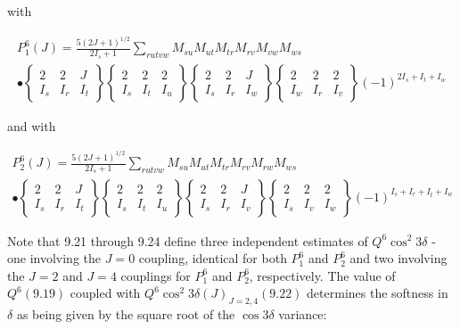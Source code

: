 \documentclass[10pt]{article}
\begin{document}
with


\begin{gather*}
P_{1}^{6}(J)=\frac{5(2 J+1)^{1 / 2}}{2 I_{s}+1} \sum_{r u t v w} M_{s u} M_{u t} M_{t r} M_{r v} M_{v w} M_{w s} \\
\bullet\left\{\begin{array}{ccc}
2 & 2 & J \\
I_{s} & I_{r} & I_{t}
\end{array}\right\}\left\{\begin{array}{ccc}
2 & 2 & 2 \\
I_{s} & I_{t} & I_{u}
\end{array}\right\}\left\{\begin{array}{ccc}
2 & 2 & J \\
I_{s} & I_{r} & I_{w}
\end{array}\right\}\left\{\begin{array}{ccc}
2 & 2 & 2 \\
I_{w} & I_{r} & I_{v}
\end{array}\right\}(-1)^{2 I_{s}+I_{t}+I_{w}} \tag{9.23}
\end{gather*}


and with


\begin{gather*}
P_{2}^{6}(J)=\frac{5(2 J+1)^{1 / 2}}{2 I_{s}+1} \sum_{r u t v w} M_{s u} M_{u t} M_{t r} M_{r v} M_{r w} M_{w s} \\
\bullet\left\{\begin{array}{ccc}
2 & 2 & J \\
I_{s} & I_{r} & I_{t}
\end{array}\right\}\left\{\begin{array}{ccc}
2 & 2 & 2 \\
I_{s} & I_{t} & I_{u}
\end{array}\right\}\left\{\begin{array}{ccc}
2 & 2 & J \\
I_{s} & I_{r} & I_{v}
\end{array}\right\}\left\{\begin{array}{ccc}
2 & 2 & 2 \\
I_{s} & I_{v} & I_{w}
\end{array}\right\}(-1)^{I_{s}+I_{r}+I_{t}+I_{w}} \tag{9.24}
\end{gather*}


Note that 9.21 through 9.24 define three independent estimates of $Q^{6} \cos ^{2} 3 \delta$ - one involving the $J=0$ coupling, identical for both $P_{1}^{6}$ and $P_{2}^{6}$ and two involving the $J=2$ and $J=4$ couplings for $P_{1}^{6}$ and $P_{2}^{6}$, respectively. The value of $Q^{6}(9.19)$ coupled with $Q^{6} \cos ^{2} 3 \delta(J)_{J=2,4}(9.22)$ determines the softness in $\delta$ as being given by the square root of the $\cos 3 \delta$ variance:
\end{document}

